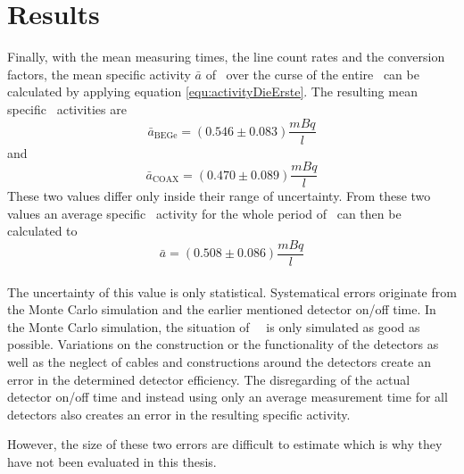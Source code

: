 \documentclass[encoding=utf8,british]{tumphthesis}
\begin{document}
\section{Results}
\label{sec:res}
Finally, with the mean measuring times, the line count rates and the conversion factors, the mean specific activity $\bar{a}$ of \Kr\ over the curse of the entire \PII\ can be calculated by applying equation \ref{equ:activityDieErste}.
The resulting mean specific \Kr\ activities are
\begin{equation*}
    \bar{a}_{\mathrm{BEGe}} = (0.546\pm0.083)	\frac{\unit{mBq}}{\unit{l}}
\end{equation*}
and
\begin{equation*}
    \bar{a}_{\mathrm{COAX}} = (0.470\pm0.089)	\frac{\unit{mBq}}{\unit{l}}
\end{equation*}
These two values differ only inside their range of uncertainty.
From these two values an average specific \Kr\ activity for the whole period of \PII\ can then be calculated to
\begin{equation*}
\bar{a} = (0.508\pm0.086)\frac{\unit{mBq}}{\unit{l}}
\end{equation*}
\\

The uncertainty of this value is only statistical.
Systematical errors originate from the Monte Carlo simulation and the earlier mentioned detector on/off time. 
In the Monte Carlo simulation, the situation of \gerda\ \PII\ is only simulated as good as possible.
Variations on the construction or the functionality of the detectors as well as the neglect of cables and constructions around the detectors create an error in the determined detector efficiency.
The disregarding of the actual detector on/off time and instead using only an average measurement time for all detectors also creates an error in the resulting specific activity.

However, the size of these two errors are difficult to estimate which is why they have not been evaluated in this thesis.
\end{document}
